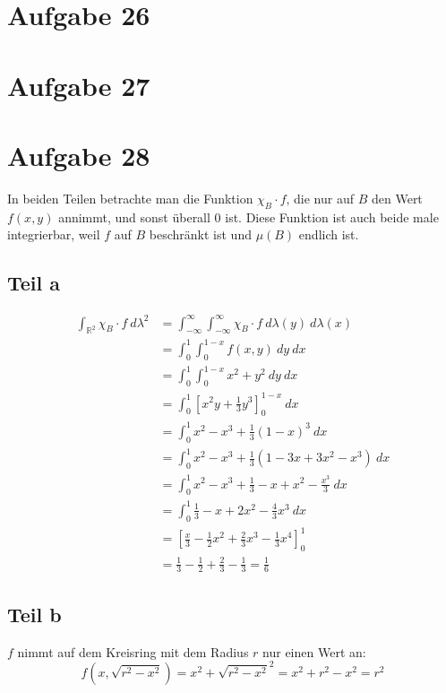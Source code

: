 \documentclass[10pt,a4paper]{article}
\begin{document}
\section{Aufgabe 26}

\section{Aufgabe 27}

\section{Aufgabe 28}
In beiden Teilen betrachte man die Funktion $\chi_{B} \cdot f$, die nur auf $B$ den Wert $f(x, y)$ annimmt, und sonst überall $0$ ist.
Diese Funktion ist auch beide male integrierbar, weil $f$ auf $B$ beschränkt ist und $\mu(B)$ endlich ist.

\subsection{Teil a}
\begin{align*}
  \int_{\mathbb{R}^{2}} \chi_{B} \cdot f\ d\lambda^{2} & = \int_{-\infty}^{\infty} \int_{-\infty}^{\infty} \chi_{B} \cdot f\ d\lambda(y)\ d\lambda(x)\\
  & = \int_{0}^{1} \int_{0}^{1 - x} f(x, y)\ dy\ dx\\
  & = \int_{0}^{1} \int_{0}^{1 - x} x^{2} + y^{2}\ dy\ dx\\
  & = \int_{0}^{1} \left[ x^{2}y + \frac{1}{3}y^{3} \right]_{0}^{1 - x}\ dx\\
  & = \int_{0}^{1} x^{2} - x^{3} + \frac{1}{3}(1 - x)^{3}\ dx\\
  & = \int_{0}^{1} x^{2} - x^{3} + \frac{1}{3}(1 - 3x + 3x^{2} - x^{3})\ dx\\
  & = \int_{0}^{1} x^{2} - x^{3} + \frac{1}{3} - x + x^{2} - \frac{x^{3}}{3}\ dx\\
  & = \int_{0}^{1} \frac{1}{3} - x + 2x^{2} - \frac{4}{3}x^{3}\ dx\\
  & = \left[ \frac{x}{3} - \frac{1}{2}x^{2} + \frac{2}{3}x^{3} - \frac{1}{3}x^{4} \right]_{0}^{1}\\
  & = \frac{1}{3} - \frac{1}{2} + \frac{2}{3} - \frac{1}{3} = \frac{1}{6}
\end{align*}

\subsection{Teil b}
$f$ nimmt auf dem Kreisring mit dem Radius $r$ nur einen Wert an:
\begin{equation}
  f(x, \sqrt{r^{2} - x^{2}}) = x^{2} + \sqrt{r^{2} - x^{2}}^{2} = x^{2} + r^{2} - x^{2} = r^{2}
\end{equation}
\end{document}
